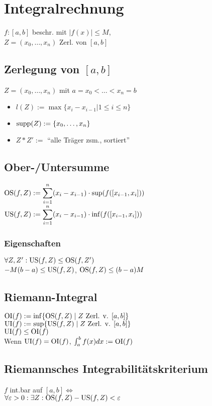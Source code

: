 \section*{Integralrechnung}

$f:[a,b]$ beschr. mit $|f(x)|\le M$,\\
$Z=(x_0,\ldots,x_n)$ Zerl. von $[a,b]$

\subsection*{Zerlegung von $[a,b]$}
$Z=(x_0, \ldots, x_n)$ mit $a=x_0<\ldots<x_n=b$
\begin{itemize}
	\item $l(Z):=\max\{x_i - x_{i-1}|1\le i \le n\}$
	\item $\operatorname{supp}(Z) := \{x_0,\ldots,x_n\}$
	\item $Z*Z' :=$ \enquote{alle Träger zsm., sortiert}
\end{itemize}

\subsection*{Ober-/Untersumme}
$\displaystyle \operatorname{OS}(f,Z) := \sum_{i=1}^n(x_i-x_{i-1})\cdot\sup(f([x_{i-1},x_i]))$ \\
$\displaystyle \operatorname{US}(f,Z) := \sum_{i=1}^n(x_i-x_{i-1})\cdot\inf(f([x_{i-1},x_i]))$

\subsubsection*{Eigenschaften}
$\forall Z,Z': \operatorname{US}(f,Z)\le\operatorname{OS}(f,Z')$ \\
$-M(b-a)\le \operatorname{US}(f,Z)$, $\operatorname{OS}(f,Z)\le (b-a)M$

\subsection*{Riemann-Integral}
$\operatorname{OI}(f) := \inf\{\operatorname{OS}(f,Z) \mid Z \text{ Zerl. v. }[a,b]\}$ \\
$\operatorname{UI}(f) := \sup\{\operatorname{US}(f,Z) \mid Z \text{ Zerl. v. }[a,b]\}$ \\
$\operatorname{UI}(f)\le\operatorname{OI}(f)$ \\
Wenn $\operatorname{UI}(f)=\operatorname{OI}(f)$, $\int_a^bf(x)dx := \operatorname{OI}(f)$

\subsection*{Riemannsches Integrabilitätskriterium}
$f$ int.bar auf $[a,b] \iff$ \\
$\forall \varepsilon>0:\exists Z: \operatorname{OS}(f,Z)-\operatorname{US}(f,Z)<\varepsilon$

